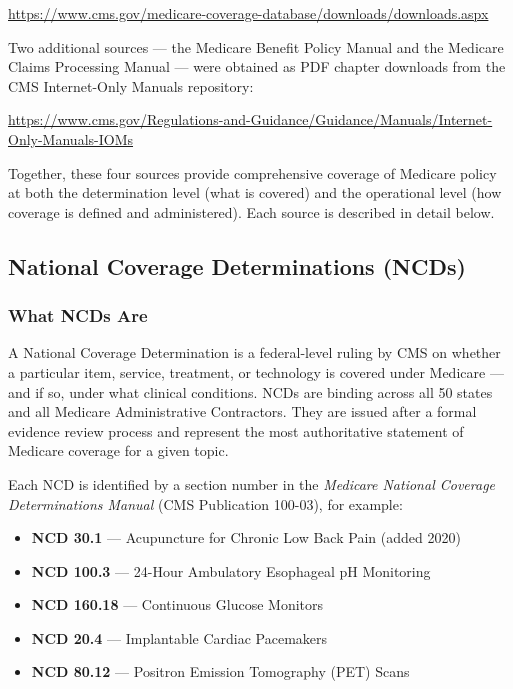 \documentclass[12pt, letterpaper]{article}
\begin{document}
\begin{center}
    \url{https://www.cms.gov/medicare-coverage-database/downloads/downloads.aspx}
\end{center}

Two additional sources --- the Medicare Benefit Policy Manual and the Medicare Claims
Processing Manual --- were obtained as PDF chapter downloads from the CMS Internet-Only
Manuals repository:

\begin{center}
    \url{https://www.cms.gov/Regulations-and-Guidance/Guidance/Manuals/Internet-Only-Manuals-IOMs}
\end{center}

Together, these four sources provide comprehensive coverage of Medicare policy at both
the determination level (what is covered) and the operational level (how coverage is
defined and administered). Each source is described in detail below.

\subsection{National Coverage Determinations (NCDs)}

\subsubsection{What NCDs Are}

A National Coverage Determination is a federal-level ruling by CMS on whether a
particular item, service, treatment, or technology is covered under Medicare --- and if
so, under what clinical conditions. NCDs are binding across all 50 states and all
Medicare Administrative Contractors. They are issued after a formal evidence review
process and represent the most authoritative statement of Medicare coverage for a given
topic.

Each NCD is identified by a section number in the \textit{Medicare National Coverage
Determinations Manual} (CMS Publication 100-03), for example:

\begin{itemize}[noitemsep, topsep=4pt]
    \item \textbf{NCD 30.1} --- Acupuncture for Chronic Low Back Pain (added 2020)
    \item \textbf{NCD 100.3} --- 24-Hour Ambulatory Esophageal pH Monitoring
    \item \textbf{NCD 160.18} --- Continuous Glucose Monitors
    \item \textbf{NCD 20.4} --- Implantable Cardiac Pacemakers
    \item \textbf{NCD 80.12} --- Positron Emission Tomography (PET) Scans
\end{itemize}
\end{document}
